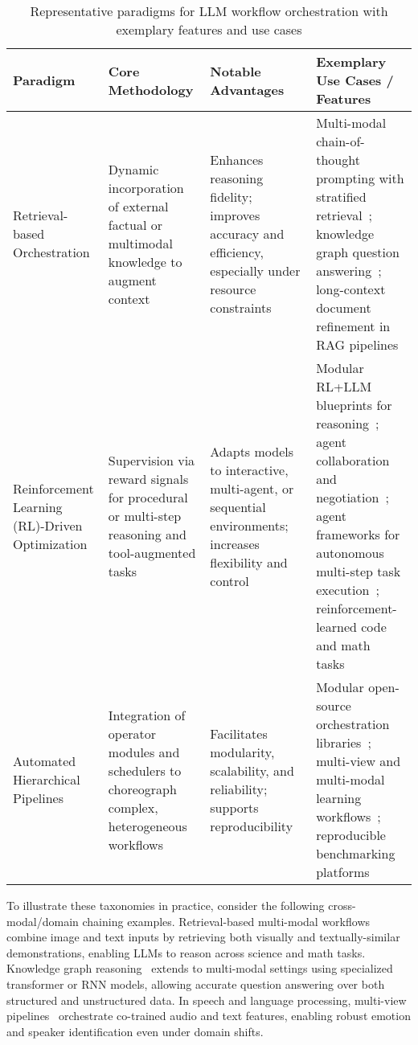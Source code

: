 \documentclass[sigconf]{acmart}
\begin{document}
\begin{table*}[htbp]
\centering
\caption{Representative paradigms for LLM workflow orchestration with exemplary features and use cases}
\label{tab:workflow_paradigms}
\begin{adjustbox}{max width=\textwidth}
\begin{tabular}{@{}llll@{}}
\toprule
\textbf{Paradigm} & \textbf{Core Methodology} & \textbf{Notable Advantages} & \textbf{Exemplary Use Cases / Features} \\
\midrule
Retrieval-based Orchestration & Dynamic incorporation of external factual or multimodal knowledge to augment context & Enhances reasoning fidelity; improves accuracy and efficiency, especially under resource constraints~\cite{ref5,ref50,ref79,ref80} & Multi-modal chain-of-thought prompting with stratified retrieval~\cite{ref5}; knowledge graph question answering~\cite{ref50}; long-context document refinement in RAG pipelines~\cite{ref80} \\
Reinforcement Learning (RL)-Driven Optimization & Supervision via reward signals for procedural or multi-step reasoning and tool-augmented tasks & Adapts models to interactive, multi-agent, or sequential environments; increases flexibility and control~\cite{ref8,ref9,ref12,ref37,ref55,ref60,ref64,ref86} & Modular RL+LLM blueprints for reasoning~\cite{ref12}; agent collaboration and negotiation~\cite{ref60}; agent frameworks for autonomous multi-step task execution~\cite{ref55}; reinforcement-learned code and math tasks~\cite{ref57} \\
Automated Hierarchical Pipelines & Integration of operator modules and schedulers to choreograph complex, heterogeneous workflows & Facilitates modularity, scalability, and reliability; supports reproducibility~\cite{ref12,ref64,ref86,ref79} & Modular open-source orchestration libraries~\cite{ref12,ref64}; multi-view and multi-modal learning workflows~\cite{ref79}; reproducible benchmarking platforms~\cite{ref64} \\
\bottomrule
\end{tabular}
\end{adjustbox}
\end{table*}

To illustrate these taxonomies in practice, consider the following cross-modal/domain chaining examples. Retrieval-based multi-modal workflows~\cite{ref5} combine image and text inputs by retrieving both visually and textually-similar demonstrations, enabling LLMs to reason across science and math tasks. Knowledge graph reasoning~\cite{ref50} extends to multi-modal settings using specialized transformer or RNN models, allowing accurate question answering over both structured and unstructured data. In speech and language processing, multi-view pipelines~\cite{ref79} orchestrate co-trained audio and text features, enabling robust emotion and speaker identification even under domain shifts.
\end{document}
